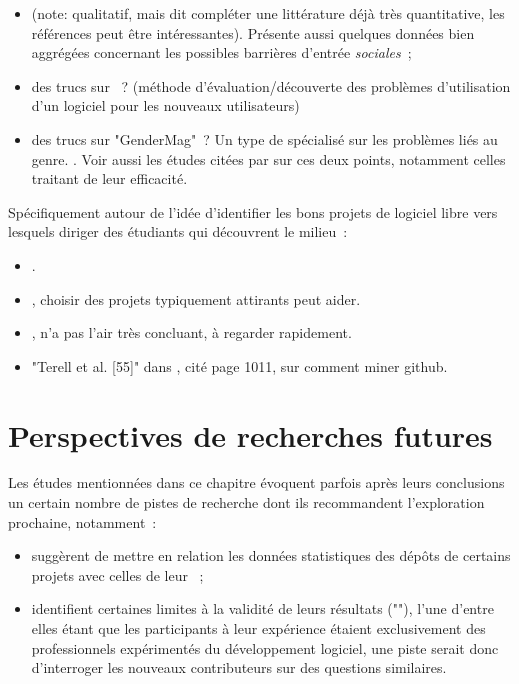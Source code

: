 \begin{itemize}
    \item {} (note: qualitatif, mais dit compléter une littérature déjà très
        quantitative, les références peut être intéressantes). Présente aussi quelques données bien aggrégées
        concernant les possibles barrières d'entrée \emph{sociales} ;
    \item des trucs sur  ? (méthode  d'évaluation/découverte des
        problèmes d'utilisation d'un logiciel pour les nouveaux utilisateurs)
    \item des trucs sur "GenderMag" ? Un type de  spécialisé sur les problèmes liés
        au genre. . Voir aussi les études citées par
        \textcite[p.~1005-1006]{barriers-2018} sur ces deux points, notamment celles traitant de leur
        efficacité.
\end{itemize}

Spécifiquement autour de l'idée d'identifier les bons projets de logiciel libre vers lesquels diriger des
étudiants qui découvrent le milieu :

\begin{itemize}
    \item {}.
    \item {}, choisir des projets typiquement attirants peut aider.
    \item {}, n'a pas l'air très concluant, à regarder rapidement.
    \item "Terell et al. [55]" dans \textcite{barriers-2018}, cité page 1011, sur comment miner github.
\end{itemize}

\section{Perspectives de recherches futures}

Les études mentionnées dans ce chapitre évoquent parfois après leurs conclusions un certain nombre de pistes
de recherche dont ils recommandent l'exploration prochaine, notamment :

\begin{itemize}
    \item \textcite[p.~14]{contribution-patterns-2010} suggèrent de mettre en relation les données
        statistiques des \glspl{dépôt} de certains projets avec celles de leur  ;
    \item \textcite[p.~1013]{barriers-2018} identifient certaines limites à la validité de leurs résultats
        (""), l'une d'entre elles étant que les participants à leur expérience
         étaient exclusivement des professionnels expérimentés du développement logiciel, une
        piste serait donc d'interroger les nouveaux contributeurs sur des questions similaires.
\end{itemize}


